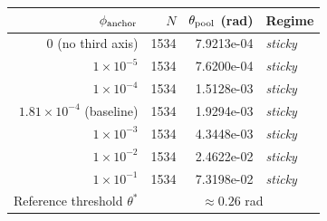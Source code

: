 \begin{tabular}{@{}rrrl@{}}
\toprule
$\phi_{\rm anchor}$ & $N$ & $\theta_{\rm pool}$ (rad) & Regime \\
\midrule
$0$ (no third axis) & 1534 & 7.9213e-04 & \emph{sticky} \\
$1\times 10^{-5}$ & 1534 & 7.6200e-04 & \emph{sticky} \\
$1\times 10^{-4}$ & 1534 & 1.5128e-03 & \emph{sticky} \\
$1.81\times 10^{-4}$ (baseline) & 1534 & 1.9294e-03 & \emph{sticky} \\
$1\times 10^{-3}$ & 1534 & 4.3448e-03 & \emph{sticky} \\
$1\times 10^{-2}$ & 1534 & 2.4622e-02 & \emph{sticky} \\
$1\times 10^{-1}$ & 1534 & 7.3198e-02 & \emph{sticky} \\
\midrule
Reference threshold $\theta^{*}$ & \multicolumn{3}{c}{$\approx 0.26$ rad} \\
\bottomrule
\end{tabular}